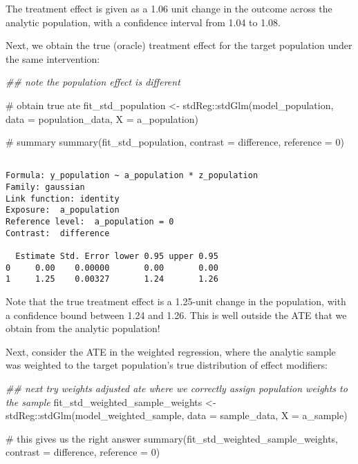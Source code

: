 \documentclass[
  single column]{article}
\newenvironment{Shaded}{\begin{snugshade}}{\end{snugshade}}
\newcommand{\AttributeTok}[1]{\textcolor[rgb]{0.40,0.45,0.13}{#1}}
\newcommand{\CommentTok}[1]{\textcolor[rgb]{0.37,0.37,0.37}{#1}}
\newcommand{\DecValTok}[1]{\textcolor[rgb]{0.68,0.00,0.00}{#1}}
\newcommand{\DocumentationTok}[1]{\textcolor[rgb]{0.37,0.37,0.37}{\textit{#1}}}
\newcommand{\FunctionTok}[1]{\textcolor[rgb]{0.28,0.35,0.67}{#1}}
\newcommand{\NormalTok}[1]{\textcolor[rgb]{0.00,0.23,0.31}{#1}}
\newcommand{\OtherTok}[1]{\textcolor[rgb]{0.00,0.23,0.31}{#1}}
\newcommand{\SpecialCharTok}[1]{\textcolor[rgb]{0.37,0.37,0.37}{#1}}
\newcommand{\StringTok}[1]{\textcolor[rgb]{0.13,0.47,0.30}{#1}}
\begin{document}
The treatment effect is given as a 1.06 unit change in the outcome
across the analytic population, with a confidence interval from 1.04 to
1.08.

Next, we obtain the true (oracle) treatment effect for the target
population under the same intervention:

\begin{Shaded}
\begin{Highlighting}[]
\DocumentationTok{\#\# note the population effect is different}

\CommentTok{\# obtain true ate}
\NormalTok{fit\_std\_population }\OtherTok{\textless{}{-}}\NormalTok{ stdReg}\SpecialCharTok{::}\FunctionTok{stdGlm}\NormalTok{(model\_population, }
  \AttributeTok{data =}\NormalTok{ population\_data, }\AttributeTok{X =} \StringTok{\textquotesingle{}a\_population\textquotesingle{}}\NormalTok{)}

\CommentTok{\# summary}
\FunctionTok{summary}\NormalTok{(fit\_std\_population, }\AttributeTok{contrast =} \StringTok{\textquotesingle{}difference\textquotesingle{}}\NormalTok{, }\AttributeTok{reference =} \DecValTok{0}\NormalTok{)}
\end{Highlighting}
\end{Shaded}

\begin{verbatim}

Formula: y_population ~ a_population * z_population
Family: gaussian 
Link function: identity 
Exposure:  a_population 
Reference level:  a_population = 0 
Contrast:  difference 

  Estimate Std. Error lower 0.95 upper 0.95
0     0.00    0.00000       0.00       0.00
1     1.25    0.00327       1.24       1.26
\end{verbatim}

Note that the true treatment effect is a 1.25-unit change in the
population, with a confidence bound between 1.24 and 1.26. This is well
outside the ATE that we obtain from the analytic population!

Next, consider the ATE in the weighted regression, where the analytic
sample was weighted to the target population's true distribution of
effect modifiers:

\begin{Shaded}
\begin{Highlighting}[]
\DocumentationTok{\#\# next try weights adjusted ate where we correctly assign population weights to the sample}
\NormalTok{fit\_std\_weighted\_sample\_weights }\OtherTok{\textless{}{-}}\NormalTok{ stdReg}\SpecialCharTok{::}\FunctionTok{stdGlm}\NormalTok{(model\_weighted\_sample, }
  \AttributeTok{data =}\NormalTok{ sample\_data, }\AttributeTok{X =} \StringTok{\textquotesingle{}a\_sample\textquotesingle{}}\NormalTok{)}

\CommentTok{\# this gives us the right answer}
\FunctionTok{summary}\NormalTok{(fit\_std\_weighted\_sample\_weights, }\AttributeTok{contrast =} \StringTok{\textquotesingle{}difference\textquotesingle{}}\NormalTok{, }\AttributeTok{reference =} \DecValTok{0}\NormalTok{)}
\end{Highlighting}
\end{Shaded}
\end{document}
